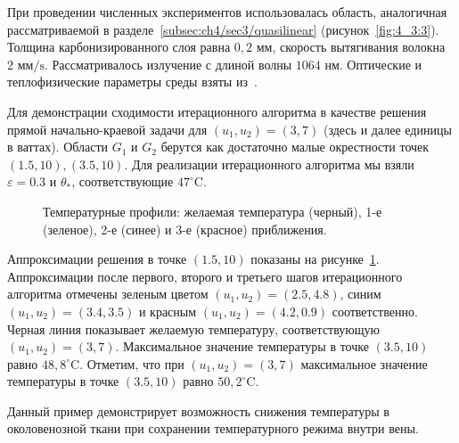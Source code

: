При проведении численных экспериментов использовалась область,
аналогичная рассматриваемой в разделе~\ref{subsec:ch4/sec3/quasilinear}
(рисунок~\ref{fig:4_3:3}).
Толщина карбонизированного слоя равна $0,2 \text{~мм}$,
скорость вытягивания волокна $2 \text{~мм}/\text{s}$.
Рассматривалось излучение с длиной волны $1064 \text{~нм}$.
Оптические и теплофизические параметры среды взяты
из~\cite{van2014optical, Some_Poluektova2014, Endovenous_Malskat2014}.


Для демонстрации сходимости итерационного алгоритма в качестве
решения прямой начально-краевой задачи для $\left(u_{1}, u_{2}\right)=( 3,7)$
(здесь и далее единицы в ваттах).
Области $G_{1}$ и $G_{2}$ берутся как достаточно малые окрестности
точек $(1.5,10),(3.5,10)$.
Для реализации итерационного алгоритма мы взяли $\varepsilon=0.3$ и $\theta_{*}$,
соответствующие $47^{\circ} \text{C}$.


\begin{figure}[h!t]
    \caption{Температурные профили: желаемая температура (черный),
        1-е (зеленое), 2-е (синее) и 3-е (красное) приближения.}
    \label{fig:4_3:7}
\end{figure}



Аппроксимации решения в точке $(1.5,10)$ показаны на рисунке~\ref{fig:4_3:7}.
Аппроксимации после первого, второго и третьего шагов итерационного
алгоритма отмечены зеленым цветом
$\left(u_{1 }, u_{2}\right)=(2.5,4.8)$,
синим  $\left(u_{1}, u_{2}\right)=(3.4,3.5)$
и красным $\left(u_{1}, u_{2}\right)=(4.2,0.9)$ соответственно.
Черная линия показывает желаемую температуру, соответствующую
$\left(u_{1}, u_{2}\right)=(3,7)$.
Максимальное значение температуры в точке $(3.5,10)$ равно $48,8^{\circ}\text{C}$.
Отметим, что при $\left(u_{1}, u_{2}\right)=(3,7)$ максимальное значение
температуры в точке $(3.5,10)$ равно $50,2^{ \circ} \text{C}$.

Данный пример демонстрирует возможность снижения температуры в
околовенозной ткани при сохранении температурного режима внутри вены.
